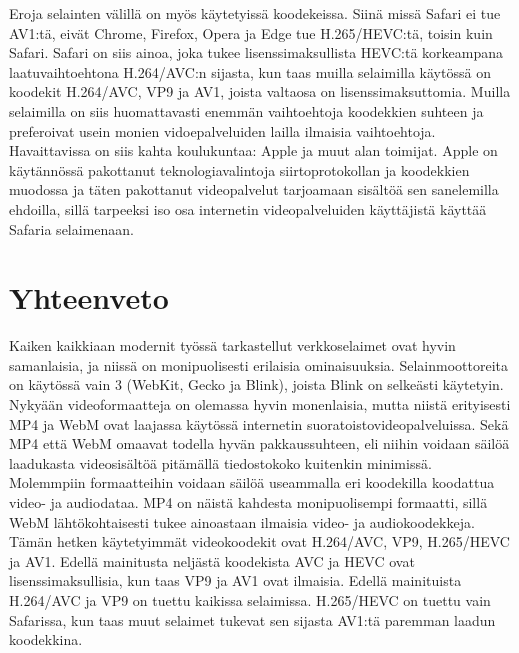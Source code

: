 \documentclass[finnish, 12pt, a4paper, elec, utf8, a-1b, online]{aaltothesis}
\begin{document}
\noindent Eroja selainten välillä on myös käytetyissä koodekeissa. Siinä missä Safari ei tue AV1:tä, eivät Chrome, Firefox, Opera ja Edge tue H.265/HEVC:tä, toisin kuin Safari. Safari on siis ainoa, joka tukee lisenssimaksullista HEVC:tä korkeampana laatuvaihtoehtona H.264/AVC:n sijasta, kun taas muilla selaimilla käytössä on koodekit H.264/AVC, VP9 ja AV1, joista valtaosa on lisenssimaksuttomia. Muilla selaimilla on siis huomattavasti enemmän vaihtoehtoja koodekkien suhteen ja preferoivat usein monien vidoepalveluiden lailla ilmaisia vaihtoehtoja. \\

\noindent Havaittavissa on siis kahta koulukuntaa: Apple ja muut alan toimijat. Apple on käytännössä pakottanut teknologiavalintoja siirtoprotokollan ja koodekkien muodossa ja täten pakottanut videopalvelut tarjoamaan sisältöä sen sanelemilla ehdoilla, sillä tarpeeksi iso osa internetin videopalveluiden käyttäjistä käyttää Safaria selaimenaan.

\clearpage


\section{Yhteenveto}

Kaiken kaikkiaan modernit työssä tarkastellut verkkoselaimet ovat hyvin samanlaisia, ja niissä on monipuolisesti erilaisia ominaisuuksia. Selainmoottoreita on käytössä vain 3 (WebKit, Gecko ja Blink), joista Blink on selkeästi käytetyin. \\

\noindent Nykyään videoformaatteja on olemassa hyvin monenlaisia, mutta niistä erityisesti MP4 ja WebM ovat laajassa käytössä internetin suoratoistovideopalveluissa. Sekä MP4 että WebM omaavat todella hyvän pakkaussuhteen, eli niihin voidaan säilöä laadukasta videosisältöä pitämällä tiedostokoko kuitenkin minimissä. Molemmpiin formaatteihin voidaan säilöä useammalla eri koodekilla koodattua video- ja audiodataa. MP4 on näistä kahdesta monipuolisempi formaatti, sillä WebM lähtökohtaisesti tukee ainoastaan ilmaisia video- ja audiokoodekkeja. \\

\noindent Tämän hetken käytetyimmät videokoodekit ovat H.264/AVC, VP9, H.265/HEVC ja AV1. Edellä mainitusta neljästä koodekista AVC ja HEVC ovat lisenssimaksullisia, kun taas VP9 ja AV1 ovat ilmaisia. Edellä mainituista H.264/AVC ja VP9 on tuettu kaikissa selaimissa. H.265/HEVC on tuettu vain Safarissa, kun taas muut selaimet tukevat sen sijasta AV1:tä paremman laadun koodekkina. \\
\end{document}
